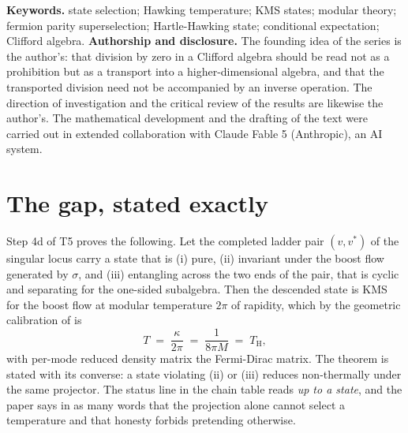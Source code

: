 \documentclass[11pt]{article}
\theoremstyle{definition}
\theoremstyle{plain}
\providecommand{\TH}{}\renewcommand{\TH}{T_{\mathrm{H}}}
\begin{document}
\textbf{Keywords.} state selection; Hawking temperature; KMS states; modular theory; fermion parity superselection; Hartle-Hawking state; conditional expectation; Clifford algebra.
\newpage
\noindent \textbf{Authorship and disclosure. }The founding idea of the series is the author's: that division by zero in a Clifford algebra should be read not as a prohibition but as a transport into a higher-dimensional algebra, and that the transported division need not be accompanied by an inverse operation. The direction of investigation and the critical review of the results are likewise the author's. The mathematical development and the drafting of the text were carried out in extended collaboration with Claude Fable 5 (Anthropic), an AI system.

\noindent{}
\newpage

\section{The gap, stated exactly}

\label{c:note.state-selection.setting-gap-stated-exactly}
Step 4d of T5 \cite{ButlerT5} proves the following. Let the completed ladder pair $(v, v^{*})$ of the singular locus carry a state that is (i) pure, (ii) invariant under the boost flow generated by $\sigma$, and (iii) entangling across the two ends of the pair, that is cyclic and separating for the one-sided subalgebra. Then the descended state is KMS for the boost flow at modular temperature $2\pi$ of rapidity, which by the geometric calibration of \cite[Prop.~6.2]{ButlerT5} is
\[
T \;=\; \frac{\kappa}{2\pi} \;=\; \frac{1}{8\pi M} \;=\; \TH ,
\]
with per-mode reduced density matrix the Fermi-Dirac matrix. The theorem is stated with its converse: a state violating (ii) or (iii) reduces non-thermally under the same projector. The status line in the chain table reads \emph{up to a state}, and the paper says in as many words that the projection alone cannot select a temperature and that honesty forbids pretending otherwise.
\end{document}
